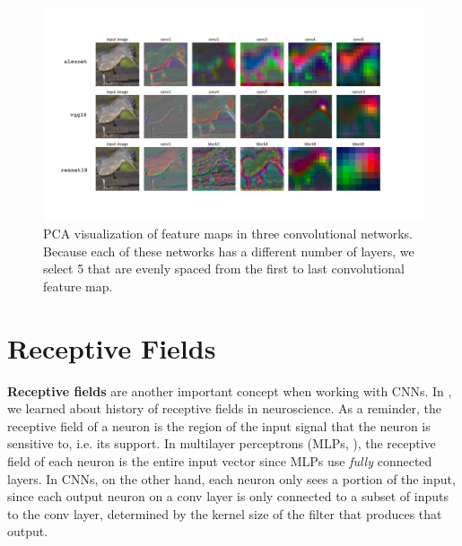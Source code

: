 \begin{figure}[h]
    \centerline{
    \includegraphics[width=1.0\linewidth]{figures/convolutional_neural_nets/feature_maps_pca_viz.pdf}
    }
    \caption{PCA visualization of feature maps in three convolutional networks. Because each of these networks has a different number of layers, we select 5 that are evenly spaced from the first to last convolutional feature map.}
    \label{fig:convolutional_neural_nets:feature_maps_pca_viz}
\end{figure}


\section{Receptive Fields}\label{sec:convolutional_neural_nets:receptive_fields}

\textbf{Receptive fields} are another important concept when working with CNNs. In \chap{\ref{chap:challenge_of_vision}}, we learned about history of receptive fields in neuroscience. As a reminder, the receptive field of a neuron is the region of the input signal that the neuron is sensitive to, i.e. its support. In multilayer perceptrons (MLPs, \chap{\ref{chapter:neural_nets}}), the receptive field of each neuron is the entire input vector since MLPs use \textit{fully} connected layers. In CNNs, on the other hand, each neuron only sees a portion of the input, since each output neuron on a conv layer is only connected to a subset of inputs to the conv layer, determined by the kernel size of the filter that produces that output.

